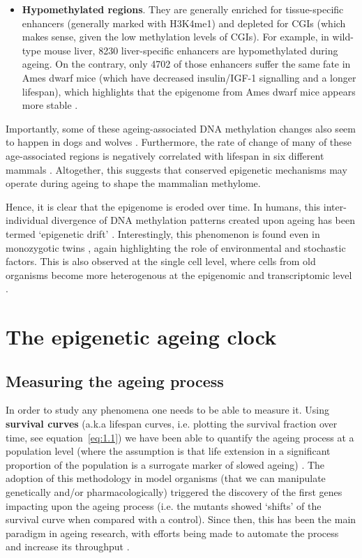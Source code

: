 \begin{itemize}
	\item \textbf{Hypomethylated regions}. They are generally enriched for tissue-specific enhancers (generally marked with H3K4me1) and depleted for \acrshort{CGI}s (which makes sense, given the low methylation levels of CGIs). For example, in wild-type mouse liver, 8230 liver-specific enhancers are hypomethylated during ageing. On the contrary, only 4702 of those enhancers suffer the same fate in Ames dwarf mice (which have decreased insulin/IGF-1 signalling and a longer lifespan), which highlights that the epigenome from Ames dwarf mice appears more stable \citep{Cole2017}.     
	
\end{itemize} 

Importantly, some of these ageing-associated DNA methylation changes also seem to happen in dogs and wolves \citep{Thompson2017}. Furthermore, the rate of change of many of these age-associated regions is negatively correlated with lifespan in six different mammals \citep{Lowe2018}. Altogether, this suggests that conserved epigenetic mechanisms may operate during ageing to shape the mammalian methylome.

\bigskip

Hence, it is clear that the epigenome is eroded over time. In humans, this inter-individual divergence of DNA methylation patterns created upon ageing has been termed `epigenetic drift' \citep{West2013}. Interestingly, this phenomenon is found even in monozygotic twins \citep{Fraga2005,Talens2012}, again highlighting the role of environmental and stochastic factors. This is also observed at the single cell level, where cells from old organisms become more heterogenous at the epigenomic and transcriptomic level \citep{Hernando-Herraez2018,Martinez-Jimenez2017}.

\bigskip

\section{The epigenetic ageing clock}

\subsection{Measuring the ageing process}

\smallskip

In order to study any phenomena one needs to be able to measure it. Using \textbf{survival curves} (a.k.a lifespan curves, i.e. plotting the survival fraction over time, see equation~\ref{eq:1.1}) we have been able to quantify the ageing process at a population level (where the assumption is that life extension in a significant proportion of the population is a surrogate marker of slowed ageing) \citep{Johnson2013}. The adoption of this methodology in model organisms (that we can manipulate genetically and/or pharmacologically) triggered the discovery of the first genes impacting upon the ageing process (i.e. the mutants showed `shifts' of the survival curve when compared with a control). Since then, this has been the main paradigm in ageing research, with efforts being made to automate the process and increase its throughput \citep{Stroustrup2013}.


